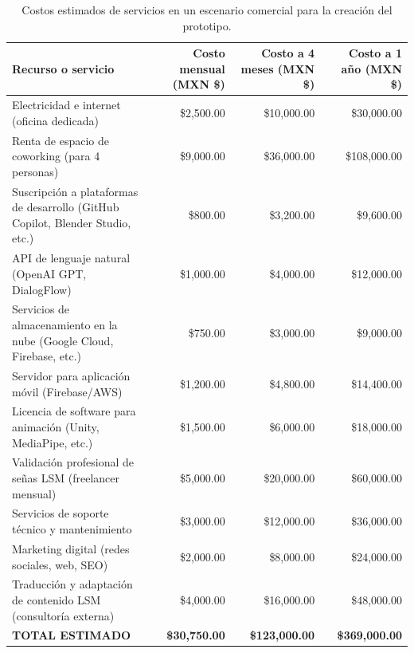 \begin{table}[H]
	\centering
	\renewcommand{\arraystretch}{1.6}
	\setlength{\tabcolsep}{12pt}
	\Huge %
	\begin{adjustbox}{max width=\textwidth}
		\begin{tabular}{|p{7cm}|r|r|r|}
			\hline
			\textbf{Recurso o servicio} & \textbf{Costo mensual (MXN \$)} & \textbf{Costo a 4 meses (MXN \$)} & \textbf{Costo a 1 año (MXN \$)} \\ \hline
			Electricidad e internet (oficina dedicada) & \$2,500.00 & \$10,000.00 & \$30,000.00 \\ \hline
			Renta de espacio de coworking (para 4 personas) & \$9,000.00 & \$36,000.00 & \$108,000.00 \\ \hline
			Suscripción a plataformas de desarrollo (GitHub Copilot, Blender Studio, etc.) & \$800.00 & \$3,200.00 & \$9,600.00 \\ \hline
			API de lenguaje natural (OpenAI GPT, DialogFlow) & \$1,000.00 & \$4,000.00 & \$12,000.00 \\ \hline
			Servicios de almacenamiento en la nube (Google Cloud, Firebase, etc.) & \$750.00 & \$3,000.00 & \$9,000.00 \\ \hline
			Servidor para aplicación móvil (Firebase/AWS) & \$1,200.00 & \$4,800.00 & \$14,400.00 \\ \hline
			Licencia de software para animación (Unity, MediaPipe, etc.) & \$1,500.00 & \$6,000.00 & \$18,000.00 \\ \hline
			Validación profesional de señas LSM (freelancer mensual) & \$5,000.00 & \$20,000.00 & \$60,000.00 \\ \hline
			Servicios de soporte técnico y mantenimiento & \$3,000.00 & \$12,000.00 & \$36,000.00 \\ \hline
			Marketing digital (redes sociales, web, SEO) & \$2,000.00 & \$8,000.00 & \$24,000.00 \\ \hline
			Traducción y adaptación de contenido LSM (consultoría externa) & \$4,000.00 & \$16,000.00 & \$48,000.00 \\ \hline
			\textbf{TOTAL ESTIMADO} & \textbf{\$30,750.00} & \textbf{\$123,000.00} & \textbf{\$369,000.00} \\ \hline
		\end{tabular}
	\end{adjustbox}
	\caption{Costos estimados de servicios en un escenario comercial para la creación del prototipo.}
	\label{tab:costos_comercial}
\end{table}


